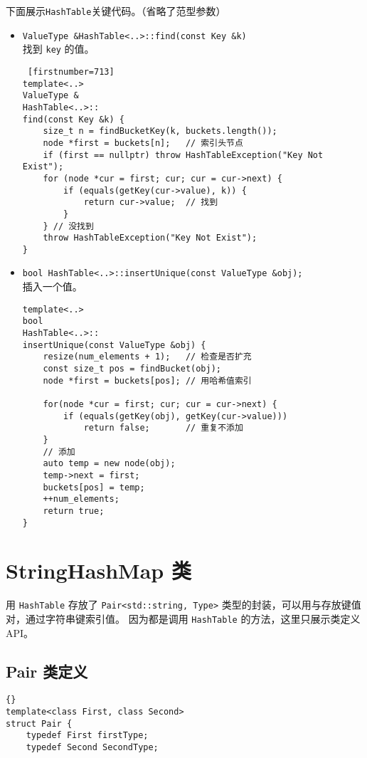 {下面展示\lstinline{HashTable}关键代码。（省略了范型参数）

\begin{itemize}
      \item \lstinline{ValueType &HashTable<..>::find(const Key &k)}\\
            找到 \lstinline{key} 的值。
\begin{lstlisting} [firstnumber=713]
template<..>
ValueType &
HashTable<..>::
find(const Key &k) {
    size_t n = findBucketKey(k, buckets.length());
    node *first = buckets[n];   // 索引头节点
    if (first == nullptr) throw HashTableException("Key Not Exist");
    for (node *cur = first; cur; cur = cur->next) {
        if (equals(getKey(cur->value), k)) {
            return cur->value;  // 找到
        }
    } // 没找到
    throw HashTableException("Key Not Exist");
}\end{lstlisting}
      \item \lstinline{bool HashTable<..>::insertUnique(const ValueType &obj);} \\
            插入一个值。
\begin{lstlisting}[escapechar=^, firstnumber=679]
template<..>
bool
HashTable<..>::
insertUnique(const ValueType &obj) {
    resize(num_elements + 1);   // 检查是否扩充
    const size_t pos = findBucket(obj);
    node *first = buckets[pos]; // 用哈希值索引

    for(node *cur = first; cur; cur = cur->next) {
        if (equals(getKey(obj), getKey(cur->value)))
            return false;       // 重复不添加
    }
    // 添加
    auto temp = new node(obj);
    temp->next = first;
    buckets[pos] = temp;
    ++num_elements;
    return true;
}\end{lstlisting}
\end{itemize}


\section{StringHashMap 类}

用 \lstinline{HashTable} 存放了 \lstinline{Pair<std::string, Type>} 类型的封装，可以用与存放键值对，通过字符串键索引值。%
因为都是调用 \lstinline{HashTable} 的方法，这里只展示类定义 API。


\subsection{Pair 类定义}
\begin{lstlisting}[firstnumber=817, caption=Pair 类定义]{}
template<class First, class Second>
struct Pair {
    typedef First firstType;
    typedef Second SecondType;


\end{lstlisting}}
